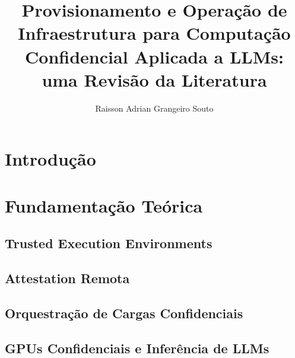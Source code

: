 \documentclass[12pt]{article}
\title{Provisionamento e Operação de Infraestrutura para Computação\\
Confidencial Aplicada a LLMs: uma Revisão da Literatura}
\author{Raisson Adrian Grangeiro Souto\inst{1}}
\begin{document}
\maketitle

\begin{abstract}
\end{abstract}

\begin{resumo}
\end{resumo}

\section{Introdução}\label{sec:intro}

\section{Fundamentação Teórica}\label{sec:fundamentacao}

\subsection{Trusted Execution Environments}

\subsection{Attestation Remota}

\subsection{Orquestração de Cargas Confidenciais}

\subsection{GPUs Confidenciais e Inferência de LLMs}
\end{document}
